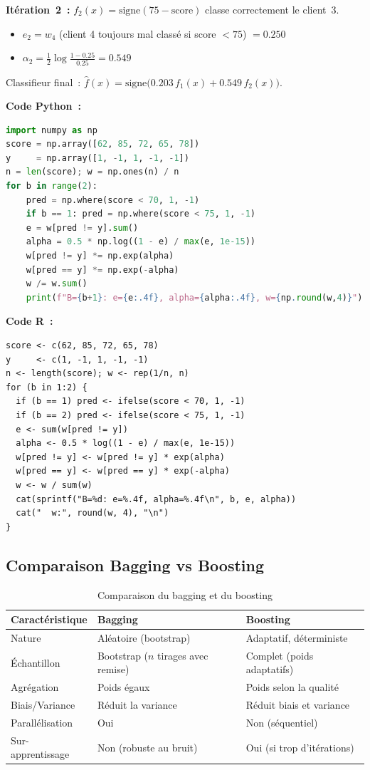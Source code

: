 \documentclass[a4paper,12pt]{article}
\begin{document}
\noindent\textbf{Itération~2~:} $f_2(x)=\text{signe}(75-\text{score})$ classe correctement le client~3.
\begin{itemize}
\item $e_2 = w_4$ (client 4 toujours mal classé si score $< 75$) $= 0.250$
\item $\alpha_2 = \frac12\log\frac{1-0.25}{0.25} = 0.549$
\end{itemize}

Classifieur final~: $\hat{f}(x) = \text{signe}\bigl(0.203\,f_1(x) + 0.549\,f_2(x)\bigr)$.

\newpage
\noindent\textbf{Code Python~:}
\begin{lstlisting}[language=Python]
import numpy as np
score = np.array([62, 85, 72, 65, 78])
y     = np.array([1, -1, 1, -1, -1])
n = len(score); w = np.ones(n) / n
for b in range(2):
    pred = np.where(score < 70, 1, -1)
    if b == 1: pred = np.where(score < 75, 1, -1)
    e = w[pred != y].sum()
    alpha = 0.5 * np.log((1 - e) / max(e, 1e-15))
    w[pred != y] *= np.exp(alpha)
    w[pred == y] *= np.exp(-alpha)
    w /= w.sum()
    print(f"B={b+1}: e={e:.4f}, alpha={alpha:.4f}, w={np.round(w,4)}")
\end{lstlisting}

\noindent\textbf{Code R~:}
\begin{lstlisting}[]
score <- c(62, 85, 72, 65, 78)
y     <- c(1, -1, 1, -1, -1)
n <- length(score); w <- rep(1/n, n)
for (b in 1:2) {
  if (b == 1) pred <- ifelse(score < 70, 1, -1)
  if (b == 2) pred <- ifelse(score < 75, 1, -1)
  e <- sum(w[pred != y])
  alpha <- 0.5 * log((1 - e) / max(e, 1e-15))
  w[pred != y] <- w[pred != y] * exp(alpha)
  w[pred == y] <- w[pred == y] * exp(-alpha)
  w <- w / sum(w)
  cat(sprintf("B=%d: e=%.4f, alpha=%.4f\n", b, e, alpha))
  cat("  w:", round(w, 4), "\n")
}
\end{lstlisting}
\newpage

\subsection{Comparaison Bagging vs Boosting}

\begin{table}[h]
\centering
\begin{tabular}{p{4cm}p{5.5cm}p{5.5cm}}
\toprule
Caractéristique & Bagging & Boosting \\
\midrule
Nature & Aléatoire (bootstrap) & Adaptatif, déterministe \\
Échantillon & Bootstrap ($n$ tirages avec remise) & Complet (poids adaptatifs) \\
Agrégation & Poids égaux & Poids selon la qualité \\
Biais/Variance & Réduit la variance & Réduit biais et variance \\
Parallélisation & Oui & Non (séquentiel) \\
Sur-apprentissage & Non (robuste au bruit) & Oui (si trop d'itérations) \\
\bottomrule
\end{tabular}
\caption{Comparaison du bagging et du boosting}
\end{table}
\end{document}
